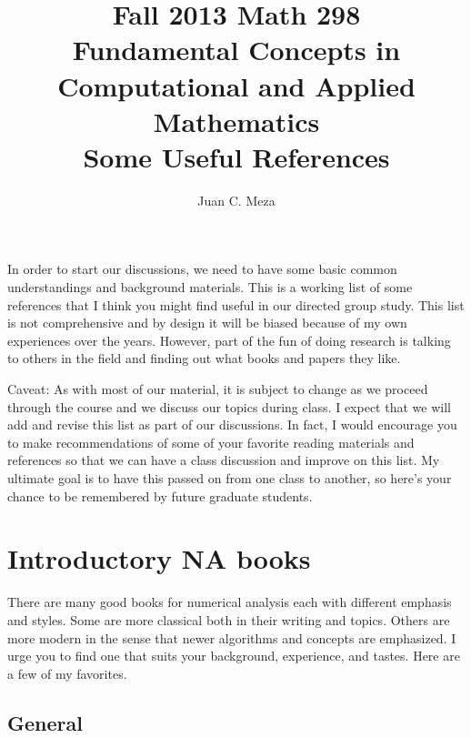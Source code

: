 \documentclass[11pt]{article}
\title{Fall 2013 Math 298\\Fundamental Concepts in \\ Computational and Applied Mathematics\\ {\small Some Useful References}}
\author{Juan C. Meza}
\begin{document}
\maketitle

In order to start our discussions, we need to have some basic common understandings and background materials.  This is a working list of some references that I think you might find useful in our directed group study.   This list is not comprehensive and by design it will be biased because of my own experiences over the years.  However, part of the fun of doing research is talking to others in the field and finding out what books and papers they like.

Caveat: As with most of our material, it is subject to change as we proceed through the course and we discuss our topics during class.  I expect that we will add and revise this list as part of our discussions.  In fact, I would encourage you to make recommendations of some of your favorite reading materials and references so that we can have a class discussion and improve on this list.  My ultimate goal is to have this passed on from one class to another, so here's your chance to be remembered by future graduate students.

\section{Introductory NA books}

There are many good books for numerical analysis each with different emphasis and styles.   Some are more classical both in their writing and topics.  Others are more modern in the sense that newer algorithms and concepts are emphasized.  I urge you to find one that suits your background, experience, and tastes.  Here are a few of my favorites.

\subsection{General}
\end{document}
